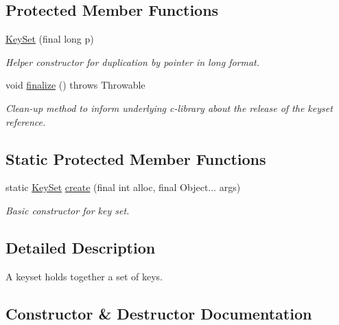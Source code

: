 \subsection*{Protected Member Functions}
\begin{DoxyCompactItemize}
\item 
\hyperlink{classorg_1_1libelektra_1_1KeySet_a72507fbeb96bfb90e44562e0a8e70331}{Key\+Set} (final long p)
\begin{DoxyCompactList}\small\item\em Helper constructor for duplication by pointer in long format. \end{DoxyCompactList}\item 
\mbox{\label{classorg_1_1libelektra_1_1KeySet_ad11eed8c4aeea5b9af381e0185b3a097}} 
void \hyperlink{classorg_1_1libelektra_1_1KeySet_ad11eed8c4aeea5b9af381e0185b3a097}{finalize} ()  throws Throwable 	
\begin{DoxyCompactList}\small\item\em Clean-\/up method to inform underlying c-\/library about the release of the keyset reference. \end{DoxyCompactList}\end{DoxyCompactItemize}
\subsection*{Static Protected Member Functions}
\begin{DoxyCompactItemize}
\item 
static \hyperlink{classorg_1_1libelektra_1_1KeySet}{Key\+Set} \hyperlink{classorg_1_1libelektra_1_1KeySet_ae3f1cd9ac1a4fd2ef7d16e6c320bc6a3}{create} (final int alloc, final Object... args)
\begin{DoxyCompactList}\small\item\em Basic constructor for key set. \end{DoxyCompactList}\end{DoxyCompactItemize}


\subsection{Detailed Description}
A keyset holds together a set of keys. 

\subsection{Constructor \& Destructor Documentation}
\mbox{\label{classorg_1_1libelektra_1_1KeySet_a72507fbeb96bfb90e44562e0a8e70331}} 
